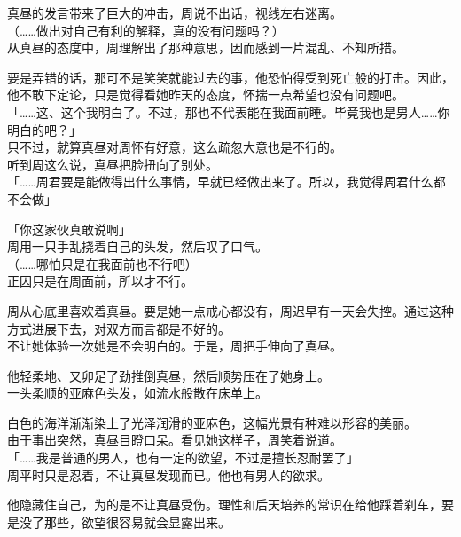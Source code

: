 真昼的发言带来了巨大的冲击，周说不出话，视线左右迷离。\\

（……做出对自己有利的解释，真的没有问题吗？）\\

从真昼的态度中，周理解出了那种意思，因而感到一片混乱、不知所措。

要是弄错的话，那可不是笑笑就能过去的事，他恐怕得受到死亡般的打击。因此，他不敢下定论，只是觉得看她昨天的态度，怀揣一点希望也没有问题吧。\\

「……这、这个我明白了。不过，那也不代表能在我面前睡。毕竟我也是男人……你明白的吧？」\\

只不过，就算真昼对周怀有好意，这么疏忽大意也是不行的。\\

听到周这么说，真昼把脸扭向了别处。\\

「……周君要是能做得出什么事情，早就已经做出来了。所以，我觉得周君什么都不会做」

「你这家伙真敢说啊」\\

周用一只手乱挠着自己的头发，然后叹了口气。\\

（……哪怕只是在我面前也不行吧）\\

正因只是在周面前，所以才不行。

周从心底里喜欢着真昼。要是她一点戒心都没有，周迟早有一天会失控。通过这种方式进展下去，对双方而言都是不好的。\\

不让她体验一次她是不会明白的。于是，周把手伸向了真昼。

他轻柔地、又卯足了劲推倒真昼，然后顺势压在了她身上。\\

一头柔顺的亚麻色头发，如流水般散在床单上。

白色的海洋渐渐染上了光泽润滑的亚麻色，这幅光景有种难以形容的美丽。\\

由于事出突然，真昼目瞪口呆。看见她这样子，周笑着说道。\\

「……我是普通的男人，也有一定的欲望，不过是擅长忍耐罢了」\\

周平时只是忍着，不让真昼发现而已。他也有男人的欲求。

他隐藏住自己，为的是不让真昼受伤。理性和后天培养的常识在给他踩着刹车，要是没了那些，欲望很容易就会显露出来。\\

